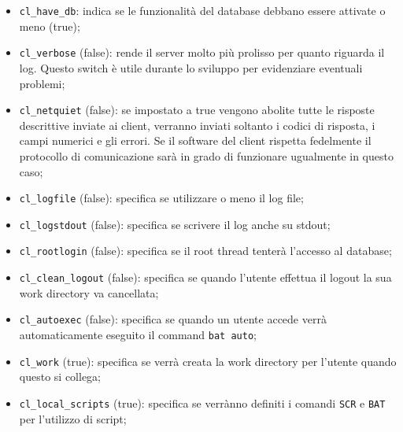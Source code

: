 \begin{itemize}
\item \verb|cl_have_db|: indica se le funzionalit\`a del database
  debbano essere attivate o meno (true);
\item \verb|cl_verbose| (false): rende il server molto pi\`u prolisso per
  quanto riguarda il log. Questo switch \`e utile durante lo sviluppo
  per evidenziare eventuali problemi;
\item \verb|cl_netquiet| (false): se impostato a true vengono abolite
  tutte le risposte descrittive inviate ai client, verranno inviati
  soltanto i codici di risposta, i campi numerici e gli errori. Se il
  software del client rispetta fedelmente il protocollo di
  comunicazione sar\`a in grado di funzionare ugualmente in questo
  caso;
\item \verb|cl_logfile| (false): specifica se utilizzare o meno il log
  file;
\item \verb|cl_logstdout| (false): specifica se scrivere il log anche
  su stdout;
\item \verb|cl_rootlogin| (false): specifica se il root thread
  tenter\`a l'accesso al database;
\item \verb|cl_clean_logout| (false): specifica se quando l'utente
  effettua il logout la sua work directory va cancellata;
\item \verb|cl_autoexec| (false): specifica se quando un utente accede
  verr\`a automaticamente eseguito il command \verb|bat auto|;
\item \verb|cl_work| (true): specifica se verr\`a creata la work
  directory per l'utente quando questo si collega;
\item \verb|cl_local_scripts| (true): specifica se verr\`anno definiti i
  comandi \verb|SCR| e \verb|BAT| per l'utilizzo di script;
\end{itemize}



